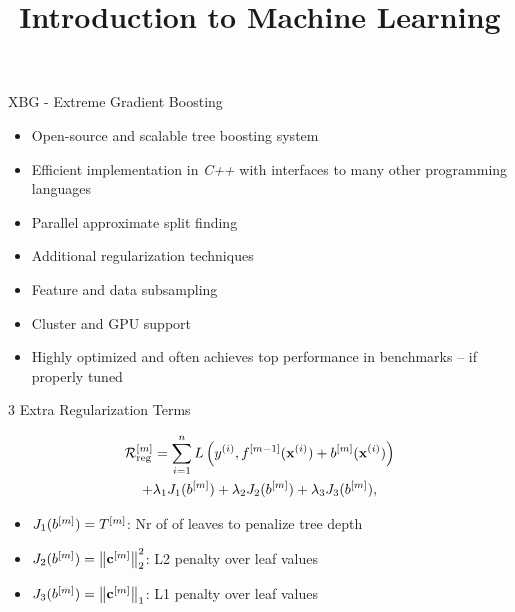 \documentclass[11pt,compress,t,notes=noshow, xcolor=table]{beamer}
\title{Introduction to Machine Learning}
\date{}
\begin{document}


\begin{vbframe}{XBG - Extreme Gradient Boosting}



  \begin{itemize}
    \item Open-source and scalable tree boosting system
    \item Efficient implementation in \emph{C++} with interfaces to many other programming languages
    \item Parallel approximate split finding
    \item Additional regularization techniques
    \item Feature and data subsampling
    \item Cluster and GPU support
    \item Highly optimized and often achieves top performance in benchmarks 
        -- if properly tuned
  \end{itemize}

\end{vbframe}

\begin{frame}{3 Extra Regularization Terms}


  \begin{multline*}
    \mathcal{R}_{\text{reg}}^{[m]} = \sum_{i=1}^{n} L\left(y^{(i)}, f^{[m-1]}(\mathbf{x}^{(i)}) + b^{[m]}(\mathbf{x}^{(i)})\right)\\
    + \lambda_1 J_1(b^{[m]}) + \lambda_2 J_2(b^{[m]}) + \lambda_3 J_3(b^{[m]}),
  \end{multline*}

  \lz
  \begin{itemize}
    \item $J_1(b^{[m]}) = T^{[m]}$:  Nr of of leaves to penalize tree depth
    \item $J_2(b^{[m]}) = \left\|\mathbf{c}^{[m]}\right\|^2_2$:  L2 penalty over leaf values 
    \item $J_3(b^{[m]}) = \left\|\mathbf{c}^{[m]}\right\|_1$: L1 penalty over leaf values 
  \end{itemize}
\end{frame}
\end{document}
